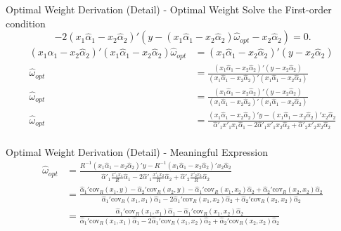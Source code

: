 \begin{frame}{Optimal Weight Derivation (Detail) - Optimal Weight}
Solve the First-order condition
\[-2(x_1 \hat\alpha_1 - x_2 \hat\alpha_2)' (y-(x_1 \hat\alpha_1 - x_2 \hat\alpha_2) \hat\omega_{opt} - x_2 \hat\alpha_2) = 0.\]
\begin{align*}
    (x_1 \hat\alpha_1 - x_2 \hat\alpha_2)' (x_1 \hat\alpha_1 - x_2 \hat\alpha_2) \hat\omega_{opt} &= (x_1 \hat\alpha_1 - x_2 \hat\alpha_2)' (y - x_2 \hat\alpha_2) \\
    \hat\omega_{opt} &= \frac{(x_1 \hat\alpha_1 - x_2 \hat\alpha_2)' (y - x_2 \hat\alpha_2)}{(x_1 \hat\alpha_1 - x_2 \hat\alpha_2)' (x_1 \hat\alpha_1 - x_2 \hat\alpha_2)} \\
    \hat\omega_{opt} &= \frac{(x_1 \hat\alpha_1 - x_2 \hat\alpha_2)' (y - x_2 \hat\alpha_2)}{(x_1 \hat\alpha_1 - x_2 \hat\alpha_2)' (x_1 \hat\alpha_1 - x_2 \hat\alpha_2)} \\
    \hat\omega_{opt} &= \frac{(x_1 \hat\alpha_1 - x_2 \hat\alpha_2)' y - (x_1 \hat\alpha_1 - x_2 \hat\alpha_2)' x_2 \hat\alpha_2}{\hat\alpha'_1 x'_1 x_1 \hat\alpha_1 - 2\hat\alpha'_1 x'_1 x_2 \hat\alpha_2 + \hat\alpha'_2 x'_2 x_2 \hat\alpha_2} \\
\end{align*}
\end{frame}



\begin{frame}{Optimal Weight Derivation (Detail) - Meaningful Expression}
\begin{align*}
  \hat\omega_{opt} 
    &= \frac{R^{-1}(x_1 \hat\alpha_1 - x_2 \hat\alpha_2)' y - R^{-1}(x_1 \hat\alpha_1 - x_2 \hat\alpha_2)' x_2 \hat\alpha_2}{\hat\alpha'_1 \frac{x'_1 x_1}{R} \hat\alpha_1 - 2\hat\alpha'_1 \frac{x'_1 x_2}{R} \hat\alpha_2 + \hat\alpha'_2 \frac{x'_2 x_2}{R} \hat\alpha_2} \\
    &= \frac{\hat\alpha_1' \text{cov}_R(x_1,y)-\hat\alpha_2'\text{cov}_R(x_2,y)-\hat\alpha_1'\text{cov}_R(x_1,x_2)\hat\alpha_2 + \hat\alpha_2'\text{cov}_R(x_2,x_2)\hat\alpha_2}{\hat\alpha_1' \text{cov}_R(x_1,x_1)\hat\alpha_1 - 2\hat\alpha_1'\text{cov}_R(x_1,x_2)\hat\alpha_2 + \hat\alpha_2'\text{cov}_R(x_2,x_2)\hat\alpha_2} \\
    &= \frac{\hat\alpha_1'\text{cov}_R(x_1,x_1)\hat\alpha_1 - \hat\alpha_1'\text{cov}_R(x_1,x_2)\hat\alpha_2}{\hat\alpha_1' \text{cov}_R(x_1,x_1)\hat\alpha_1 - 2\hat\alpha_1'\text{cov}_R(x_1,x_2)\hat\alpha_2 + \hat\alpha_2'\text{cov}_R(x_2,x_2)\hat\alpha_2}
\end{align*}
\end{frame}




